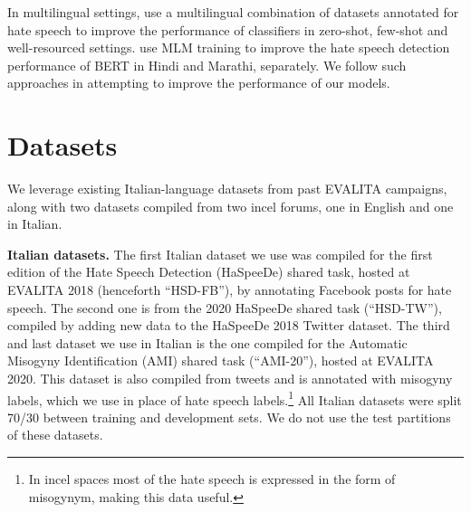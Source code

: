 \documentclass[11pt]{article}
\newcommand{\albert}{\mbox{AlBERTo}}
\newcommand{\hsdfb}{\mbox{HSD-FB}}
\newcommand{\hsdtw}{\mbox{HSD-TW}}
\newcommand{\ami}{\mbox{AMI-20}}
\begin{document}
In multilingual settings,  use a multilingual combination of datasets annotated for hate speech to improve the performance of classifiers in zero-shot, few-shot and well-resourced settings.  use MLM training to improve the hate speech detection performance of BERT in Hindi and Marathi, separately. We follow such approaches in attempting to improve the performance of our models.


\section{Datasets}
\label{sec:ceur-specs}

We leverage existing Italian-language datasets from past EVALITA
campaigns, along with two datasets compiled from two incel forums, one in English and one in Italian.

\vspace*{1mm}\noindent\textbf{Italian datasets.} The first Italian dataset we use was compiled for the first edition of the Hate Speech Detection (HaSpeeDe) shared task, hosted at EVALITA 2018 \cite{boscoOverviewEVALITA2018} (henceforth ``\hsdfb''), by annotating Facebook posts for hate speech. The second one is from the 2020 HaSpeeDe shared task \cite{basileEVALITA2020Overview} (``\hsdtw''), compiled by adding new data to the HaSpeeDe 2018 Twitter dataset. The third and last dataset we use in Italian is the one compiled for the Automatic Misogyny Identification (AMI) shared task \cite{fersiniAMIEVALITA2020Automatic2020} (``\ami''), hosted at EVALITA 2020. This dataset is also compiled from tweets and is annotated with misogyny labels, which we use in place of hate speech labels.\footnote{In incel spaces most of the hate speech is expressed in the form of misogynym, making this data useful.} All Italian datasets were split 70/30 between training and development sets. We do not use the test partitions of these datasets.
\end{document}
